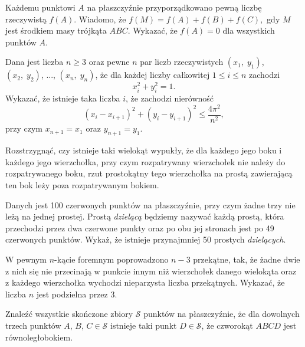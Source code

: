 \begin{problem}{1}
	Każdemu punktowi $A$ na płaszczyźnie przyporządkowano pewną liczbę rzeczywistą $f(A).$ Wiadomo, że $f(M)=f(A)+f(B)+f(C),$ gdy $M$ jest środkiem masy trójkąta $ABC.$ Wykazać, że $f(A)=0$ dla wszystkich punktów $A.$
\end{problem}

\begin{problem}{2}
	Dana jest liczba $n \geqslant 3$ oraz pewne $n$ par liczb rzeczywistych  $(x_1,\; y_1)$, $(x_2,\; y_2)$, ..., $(x_n, \; y_n)$, że dla każdej liczby całkowitej $1 \leqslant i \leqslant n$ zachodzi
	\[
		x_i^2 + y_i^2 = 1.
	\]
	Wykazać, że istnieje taka liczba $i$, że zachodzi nierówność
	\[
		(x_i - x_{i + 1})^2 + (y_i - y_{i + 1})^2 \leqslant \frac{4\pi^2}{n^2},
	\]
	przy czym $x_{n + 1} = x_1$ oraz $y_{n + 1} = y_1$.
\end{problem}


\begin{problem}{3}
	Rozstrzygnąć, czy istnieje taki wielokąt wypukły, że dla każdego jego boku i każdego jego wierzchołka, przy czym rozpatrywany wierzchołek nie należy do rozpatrywanego boku, rzut prostokątny tego wierzchołka na prostą zawierającą ten bok leży poza rozpatrywanym bokiem.
\end{problem}

\begin{problem}{4}
	Danych jest 100 czerwonych punktów na płaszczyźnie, przy czym żadne trzy nie leżą na jednej prostej. Prostą \textit{dzielącą} będziemy nazywać każdą prostą, która przechodzi przez dwa czerwone punkty oraz po obu jej stronach jest po 49 czerwonych punktów. Wykaż, że istnieje przynajmniej 50 prostych \textit{dzielących}.
\end{problem}
 
\begin{problem}{5}
	W pewnym $n$-kącie foremnym poprowadzono $n - 3$ przekątne, tak, że żadne dwie z nich się nie przecinają w punkcie innym niż wierzchołek danego wielokąta oraz z każdego wierzchołka wychodzi nieparzysta liczba przekątnych. Wykazać, że liczba $n$ jest podzielna przez $3$.
\end{problem}

\begin{problem}{6}
	Znaleźć wszystkie skończone zbiory $\mathcal{S}$ punktów na płaszczyźnie, że dla dowolnych trzech punktów $A$, $B$, $C \in \mathcal{S}$ istnieje taki punkt $D \in \mathcal{S}$, że czworokąt $ABCD$ jest równoległobokiem.
\end{problem}